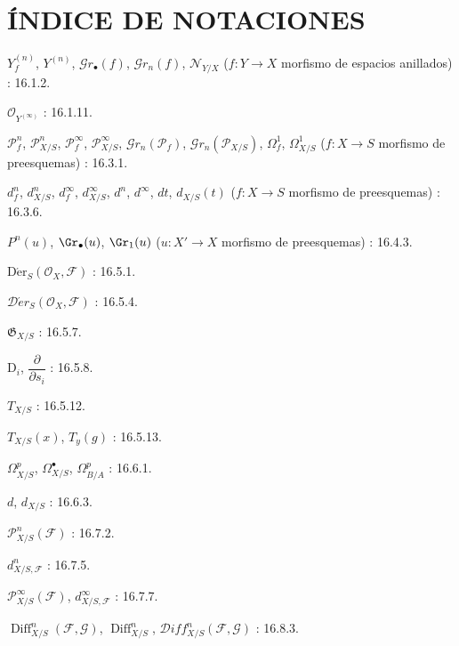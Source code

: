 \clearpage
{}
{}
\section*{ÍNDICE DE NOTACIONES}

\begingroup
\small
\setlength{\parindent}{0pt}
\setlength{\parskip}{1.5pt}

$Y_f^{(n)}$, $Y^{(n)}$, $\mathcal{G}r_{\bullet}(f)$,
$\mathcal{G}r_n(f)$, $\mathcal{N}_{Y/X}$
($f:Y\to X$ morfismo de espacios anillados) : 16.1.2.

$\mathcal{O}_{Y^{(\infty)}}$ : 16.1.11.

$\mathcal{P}^{n}_{f}$, $\mathcal{P}^{n}_{X/S}$,
$\mathcal{P}^{\infty}_{f}$, $\mathcal{P}^{\infty}_{X/S}$, $\mathcal{G}r_n(\mathcal{P}_f)$, $\mathcal{G}r_n(\mathcal{P}_{X/S})$,
$\varOmega^{1}_{f}$, $\varOmega^{1}_{X/S}$
($f:X\to S$ morfismo de preesquemas) : 16.3.1.

$d^{n}_{f}$, $d^{n}_{X/S}$, $d^{\infty}_{f}$,
$d^{\infty}_{X/S}$, $d^{n}$, $d^{\infty}$, $dt$, $d_{X/S}(t)$
($f:X\to S$ morfismo de preesquemas) : 16.3.6.

$P^{n}(u)$, $\Gr_{\bullet}(u)$, $\Gr_{1}(u)$
($u:X'\to X$ morfismo de preesquemas) : 16.4.3.

$\operatorname{D\acute{e}r}_{S}(\mathcal{O}_{X},\mathcal{F})$ : 16.5.1.

$\mathcal{D}\acute{e}r_{S}(\mathcal{O}_{X},\mathcal{F})$ : 16.5.4.

$\mathfrak{G}_{X/S}$ : 16.5.7.

$\mathrm{D}_i$, $\dfrac{\partial}{\partial s_i}$ : 16.5.8.

$T_{X/S}$ : 16.5.12.

$T_{X/S}(x)$, $T_y(g)$ : 16.5.13.

$\varOmega^p_{X/S}$, $\varOmega^\bullet_{X/S}$, $\Omega^p_{B/A}$ : 16.6.1.

$d$, $d_{X/S}$ : 16.6.3.

$\mathcal{P}^n_{X/S}(\mathcal{F})$ : 16.7.2.

$d^n_{X/S,\mathcal{F}}$ : 16.7.5.

$\mathcal{P}^{\infty}_{X/S}(\mathcal{F})$,
$d^{\infty}_{X/S,\mathcal{F}}$ : 16.7.7.

$\operatorname{Diff}^{n}_{X/S}(\mathcal{F},\mathcal{G})$,
$\operatorname{Diff}^{n}_{X/S}$,
$\mathcal{D}iff^{n}_{X/S}(\mathcal{F},\mathcal{G})$ : 16.8.3.

